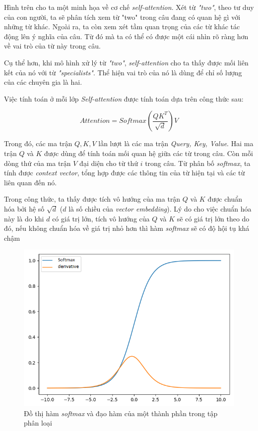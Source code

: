 Hình trên cho ta một minh họa về cơ chế \textit{self-attention}. Xét từ \textit{"two"}, theo tư duy của con người, ta sẽ phân tích xem từ "two" trong câu đang có quan hệ gì với những từ khác. Ngoài ra, ta còn xem xét tầm quan trọng của các từ khác tác động lên ý nghĩa của câu. Từ đó mà ta có thể có được một cái nhìn rõ ràng hơn về vai trò của từ này trong câu.

Cụ thể hơn, khi mô hình xử lý từ \textit{"two"}, \textit{self-attention} cho ta thấy được mối liên kết của nó với từ \textit{"specialists"}. Thể hiện vai trò của nó là dùng để chỉ số lượng của các chuyên gia là hai.

Việc tính toán ở mỗi lớp \textit{Self-attention} được tính toán dựa trên công thức sau:

\begin{equation*}
	Attention = Softmax(\frac{QK^T}{\sqrt{d}})V
\end{equation*}

Trong đó, các ma trận $Q, K, V$ lần lượt là các ma trận \textit{Query, Key, Value}. Hai ma trận $Q$ và $K$ được dùng để tính toán mối quan hệ giữa các từ trong câu. Còn mỗi dòng thứ của ma trận $V$ đại diện cho từ thứ $i$ trong câu. Từ phân bố \textit{softmax}, ta tính được \textit{context vector}, tổng hợp được các thông tin của từ hiện tại và các từ liên quan đến nó. 

Trong công thức, ta thấy được tích vô hướng của ma trận $Q$ và $K$ được chuẩn hóa bởi hệ số $\sqrt{d}$ ($d$ là số chiều của \textit{vector embedding}). Lý do cho việc chuẩn hóa này là do khi $d$ có giá trị lớn, tích vô hướng của $Q$ và $K$ sẽ có giá trị lớn theo do đó, nếu không chuẩn hóa về giá trị nhỏ hơn thì hàm \textit{softmax} sẽ có độ hội tụ khá chậm

\begin{figure}[H]
    \begin{center}
        \includegraphics[scale=0.7]{images/softmax-func}
        \caption{Đồ thị hàm \textit{softmax} và đạo hàm của một thành phần trong tập phân loại}
        \label{fig:softmax-func}
    \end{center}
\end{figure}


